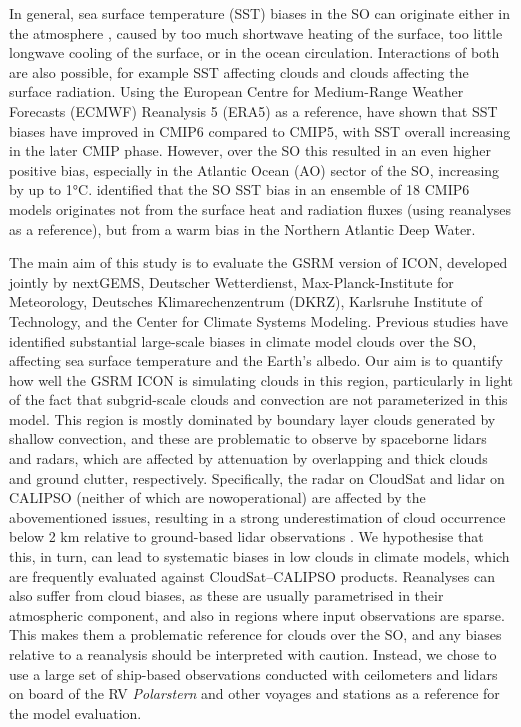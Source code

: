 \documentclass[12pt,a4paper]{article}
\begin{document}
In general, sea surface temperature (SST) biases in the SO can originate either
in the atmosphere \citep{hyder2018}, caused by too much shortwave heating of the surface, too
little longwave cooling of the surface, or in the ocean circulation.
Interactions of both are also possible, for example SST affecting clouds and
clouds affecting the surface radiation. Using the European
Centre for Medium-Range Weather Forecasts (ECMWF) Reanalysis 5 (ERA5) as a reference, \cite{zhang2023} have shown that SST
biases have improved in CMIP6 compared to CMIP5, with SST
overall increasing in the later CMIP phase. However, over the SO this resulted
in an even higher positive bias, especially in the Atlantic Ocean (AO) sector
of the SO, increasing by up to 1°C.  \cite{luo2023} identified that the SO SST
bias in an ensemble of 18 CMIP6 models originates not from the surface heat and
radiation fluxes (using reanalyses as a reference), but from a warm bias in the
Northern Atlantic Deep Water.

The main aim of this study is to evaluate the GSRM version of ICON, developed
jointly by nextGEMS, Deutscher Wetterdienst, Max-Planck-Institute for
Meteorology, Deutsches Klimarechenzentrum (DKRZ), Karlsruhe Institute of
Technology, and the Center for Climate Systems Modeling.  Previous studies have
identified substantial large-scale biases in climate model clouds over the SO,
affecting sea surface temperature and the Earth’s albedo. Our aim is to
quantify how well the GSRM ICON is simulating clouds in this region,
particularly in light of the fact that subgrid-scale clouds and convection are
not parameterized in this model. This region is mostly dominated by boundary
layer clouds generated by shallow convection, and these are problematic to
observe by spaceborne lidars and radars, which are affected by attenuation by
overlapping and thick clouds and ground clutter, respectively.  Specifically,
the radar on CloudSat and lidar on CALIPSO (neither of which are nowoperational) are affected by the abovementioned issues, resulting in a strong
underestimation of cloud occurrence below 2 km relative to ground-based lidar
observations \citep{mcerlich2021}.  We hypothesise that this, in turn, can lead to systematic
biases in low clouds in climate models, which are frequently evaluated against
CloudSat--CALIPSO products. Reanalyses can also suffer from cloud biases, as
these are usually parametrised in their atmospheric component, and also in
regions where input observations are sparse.  This makes them a problematic
reference for clouds over the SO, and any biases relative to a reanalysis
should be interpreted with caution. Instead, we chose to use a large set of
ship-based observations conducted with ceilometers and lidars on board of the
RV \emph{Polarstern} and other voyages and stations as a reference for the
model evaluation.
\end{document}
